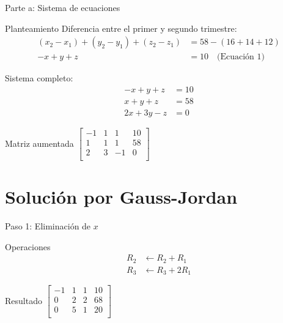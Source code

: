 \documentclass{beamer}
\begin{document}
\begin{frame}{Parte a: Sistema de ecuaciones}
\begin{block}{Planteamiento}
Diferencia entre el primer y segundo trimestre:
\begin{align*}
(x_2 - x_1) + (y_2 - y_1) + (z_2 - z_1) &= 58 - (16+14+12) \\
-x + y + z &= 10 \quad \text{(Ecuación 1)}
\end{align*}

Sistema completo:
\begin{align*}
-x + y + z &= 10 \\
x + y + z &= 58 \\
2x + 3y - z &= 0
\end{align*}
\end{block}

\begin{alertblock}{Matriz aumentada}
\centering
$\left[
\begin{array}{ccc|c}
-1 & 1 & 1 & 10 \\
1 & 1 & 1 & 58 \\
2 & 3 & -1 & 0 \\
\end{array}
\right]$
\end{alertblock}
\end{frame}

\section{Solución por Gauss-Jordan}
\begin{frame}{Paso 1: Eliminación de $x$}
\begin{block}{Operaciones}
\begin{align*}
R_2 &\leftarrow R_2 + R_1 \\
R_3 &\leftarrow R_3 + 2R_1
\end{align*}
\end{block}

\begin{exampleblock}{Resultado}
\centering
$\left[
\begin{array}{ccc|c}
-1 & 1 & 1 & 10 \\
0 & 2 & 2 & 68 \\
0 & 5 & 1 & 20 \\
\end{array}
\right]$
\end{exampleblock}
\end{frame}
\end{document}
